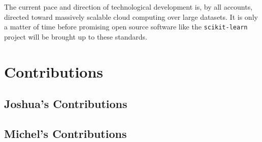 \documentclass[letterpaper,10pt]{article}
\begin{document}
The current pace and direction of technological development is, by all
accounts, directed toward massively scalable cloud computing over large
datasets. It is only a matter of time before promising open source software
like the \texttt{scikit-learn} project will be brought up to these
standards.



\section{Contributions}

\subsection{Joshua's Contributions}


\subsection{Michel's Contributions}



\clearpage


\end{document}
